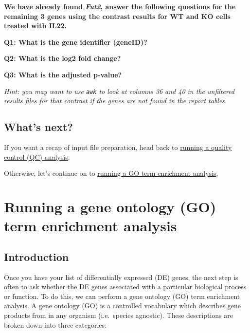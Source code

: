 \documentclass[11pt]{article}
\begin{document}
\textbf{We have already found \textit{Fut2}, answer the following
questions for the remaining 3 genes using the contrast results for WT
and KO cells treated with IL22.}

\textbf{Q1: What is the gene identifier (geneID)?}

\textbf{Q2: What is the log2 fold change?}

\textbf{Q3: What is the adjusted p-value?}

\textit{Hint: you may want to use \texttt{awk} to look at columns 36 and
40 in the unfiltered results files for that contrast if the genes are
not found in the report tables}

    \hypertarget{whats-next}{%
\subsection{What's next?}\label{whats-next}}

If you want a recap of input file preparation, head back to
\href{quality-control.ipynb}{running a quality control (QC) analysis}.

Otherwise, let's continue on to \href{go-term-enrichment.ipynb}{running
a GO term enrichment analysis}.





\newpage






    \hypertarget{running-a-gene-ontology-go-term-enrichment-analysis}{%
\section{Running a gene ontology (GO) term enrichment
analysis}\label{running-a-gene-ontology-go-term-enrichment-analysis}}

    \hypertarget{introduction}{%
\subsection{Introduction}\label{introduction}}

Once you have your list of differentially expressed (DE) genes, the next
step is often to ask whether the DE genes associated with a particular
biological process or function. To do this, we can perform a gene
ontology (GO) term enrichment analysis. A gene ontology (GO) is a
controlled vocabulary which describes gene products from in any organism
(i.e.~species agnostic). These descriptions are broken down into three
categories:
\end{document}
